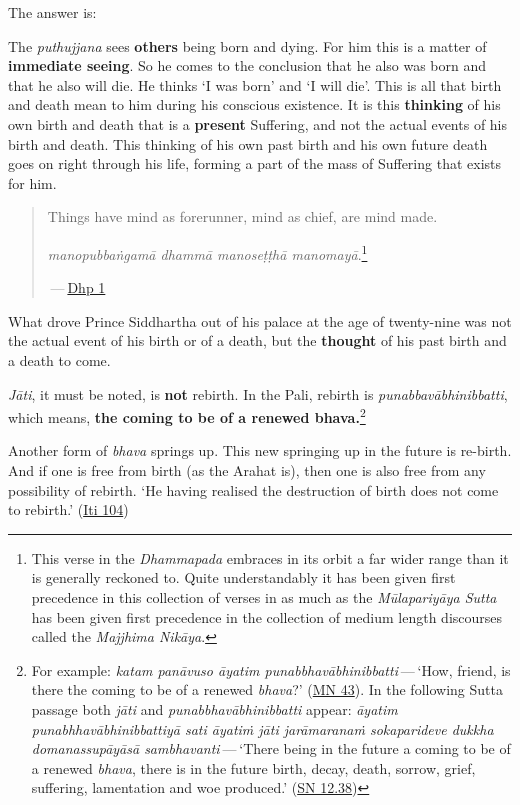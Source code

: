 The answer is:

The \emph{puthujjana} sees \textbf{others} being born and dying. For him this is a matter of \textbf{immediate seeing}. So he comes to the conclusion that he also was born and that he also will die. He thinks `I was born' and `I will die'. This is all that birth and death mean to him during his conscious existence. It is this \textbf{thinking} of his own birth and death that is a \textbf{present} Suffering, and not the actual events of his birth and death. This thinking of his own past birth and his own future death goes on right through his life, forming a part of the mass of Suffering that exists for him.

\begin{quote}
Things have mind as forerunner, mind as chief, are mind made.

\emph{manopubbaṅgamā dhammā manoseṭṭhā manomayā}.\footnote{This verse in the \emph{Dhammapada} embraces in its orbit a far wider range than it is generally reckoned to. Quite understandably it has been given first precedence in this collection of verses in as much as the \emph{Mūlapariyāya Sutta} has been given first precedence in the collection of medium length discourses called the \emph{Majjhima Nikāya}.}

 --- \href{https://suttacentral.net/dhp1-20/en/anandajoti}{Dhp 1}
\end{quote}

What drove Prince Siddhartha out of his palace at the age of twenty-nine was not the actual event of his birth or of a death, but the \textbf{thought} of his past birth and a death to come.

\emph{Jāti}, it must be noted, is \textbf{not} rebirth. In the Pali, rebirth is \emph{punabbavābhinibbatti}, which means, \textbf{the coming to be of a renewed bhava.}\footnote{For example: \emph{katam panāvuso āyatim punabbhavābhinibbatti} --- `How, friend, is there the coming to be of a renewed \emph{bhava}?' (\href{https://suttacentral.net/mn43/en/sujato}{MN 43}). In the following Sutta passage both \emph{jāti} and \emph{punabbhavābhinibbatti} appear: \emph{āyatim punabhhavābhinibbattiyā sati āyatiṁ jāti jarāmaranaṁ sokaparideve dukkha domanassupāyāsā sambhavanti} --- `There being in the future a coming to be of a renewed \emph{bhava}, there is in the future birth, decay, death, sorrow, grief, suffering, lamentation and woe produced.' (\href{https://suttacentral.net/sn12.38/en/bodhi}{SN 12.38})}

Another form of \emph{bhava} springs up. This new springing up in the future is re-birth. And if one is free from birth (as the Arahat is), then one is also free from any possibility of rebirth. `He having realised the destruction of birth does not come to rebirth.' (\href{https://suttacentral.net/iti104/en/sujato}{Iti 104})

